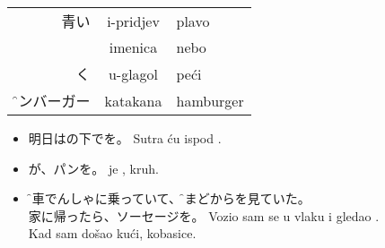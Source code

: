\documentclass[pig]{grampig}
\begin{document}
	\begin{minipage}{\width}
		\onehalfspacing
%		
%		
%		
		
		\begin{table}
			\centering
			\textsc{} \br
			\begin{tabular}{RCl}
				青い & i-pridjev & plavo \\
				 & imenica & nebo \\
				く & u-glagol & peći \\
				\f{ハンバーガー}{\strut} & katakana & hamburger \\
			\end{tabular}
		\end{table} \vspace{-1em}
		
		\singlespacing
		\begin{itemize}
			\item 明日はの下でを。\bh
			Sutra ću ispod  . \\[-0.5em]
			
			\item {}が、パンを。\bh
			 je ,  kruh. \\[-0.5em]
			
			\item {}\f{電車}{でんしゃ}に乗っていて、\f{窓}{まど}からを見ていた。\\
			家に帰ったら、ソーセージを。\bh
			Vozio sam se u  vlaku i gledao . \\
			Kad sam došao kući,  kobasice. 
		\end{itemize}　\vspace{-1.5em}
	
		\begin{center}
		\end{center}
	\end{minipage}
\end{document}
